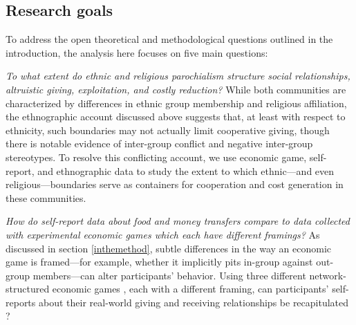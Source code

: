 \documentclass[bibauthoryear]{aa}
\begin{document}
\subsection{Research goals}
To address the open theoretical and methodological questions outlined in the introduction, the analysis here focuses on five main questions:\\
\indent
\begin{enumerate*}[label={Q(\arabic*)},font={\color{blue!50!black}\bfseries}]
\item \label{q1} \emph{To what extent do ethnic and religious parochialism structure social relationships, altruistic giving, exploitation, and costly reduction?} While both communities are characterized by differences in ethnic group membership and religious affiliation, the ethnographic account discussed above \citep{Cay73} suggests that, at least with respect to ethnicity, such boundaries may not actually limit cooperative giving, though there is notable evidence of inter-group conflict and  negative inter-group stereotypes. To resolve this conflicting account, we use economic game, self-report, and ethnographic data to study the extent to which ethnic---and even religious---boundaries serve as containers for cooperation and cost generation in these communities.
\\
\indent

\item \label{q3} \emph{How do self-report data about food and money transfers compare to data collected with experimental economic games which each have different framings?} As discussed in section \ref{inthemethod}, subtle differences in the way an economic game is framed---for example, whether it implicitly pits in-group against out-group members---can alter participants' behavior. Using three different network-structured economic  games \citep{gervais2017rich}, each with a different framing, can participants' self-reports about their real-world giving and receiving relationships be recapitulated \citep[e.g.,][]{gurven2008collective}?\\
\indent



\end{enumerate*}
\end{document}
